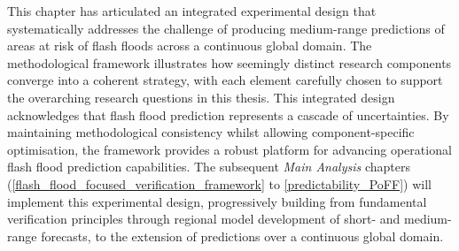This chapter has articulated an integrated experimental design that systematically addresses the challenge of producing medium-range predictions of areas at risk of flash floods across a continuous global domain. The methodological framework illustrates how seemingly distinct research components converge into a coherent strategy, with each element carefully chosen to support the overarching research questions in this thesis. This integrated design acknowledges that flash flood prediction represents a cascade of uncertainties. By maintaining methodological consistency whilst allowing component-specific optimisation, the framework provides a robust platform for advancing operational flash flood prediction capabilities. The subsequent \textit{Main Analysis} chapters (\ref{flash_flood_focused_verification_framework} to \ref{predictability_PoFF}) will implement this experimental design, progressively building from fundamental verification principles through regional model development of short- and medium-range forecasts, to the extension of predictions over a continuous global domain.
